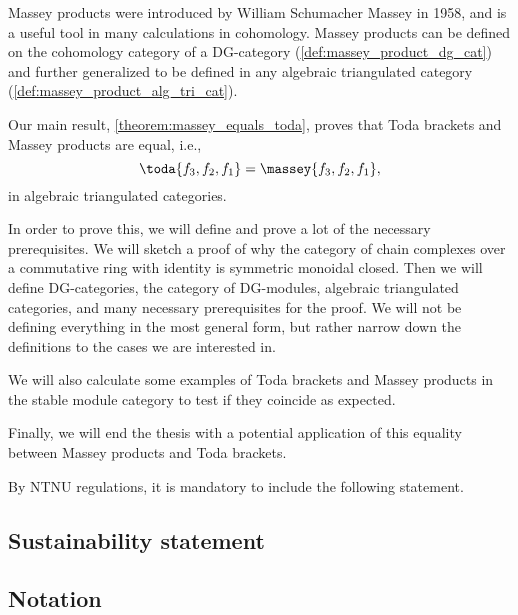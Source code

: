 Massey products were introduced by William Schumacher Massey in 1958, and is a useful tool in many calculations in cohomology. Massey products can be defined on the cohomology category of a DG-category (\autoref{def:massey_product_dg_cat}) and further generalized to be defined in any algebraic triangulated category (\autoref{def:massey_product_alg_tri_cat}).

Our main result, \autoref{theorem:massey_equals_toda}, proves that Toda brackets and Massey products are equal, i.e.,
\[
    \toda{f_3, f_2, f_1} = \massey{f_3, f_2, f_1},
\]
in algebraic triangulated categories.

In order to prove this, we will define and prove a lot of the necessary prerequisites. We will sketch a proof of why the category of chain complexes over a commutative ring with identity is symmetric monoidal closed. Then we will define DG-categories, the category of DG-modules, algebraic triangulated categories, and many necessary prerequisites for the proof. We will not be defining everything in the most general form, but rather narrow down the definitions to the cases we are interested in.

We will also calculate some examples of Toda brackets and Massey products in the stable module category to test if they coincide as expected.

Finally, we will end the thesis with a potential application of this equality between Massey products and Toda brackets.

By NTNU regulations, it is mandatory to include the following statement.
\subsection{Sustainability statement}


\subsection{Notation}
